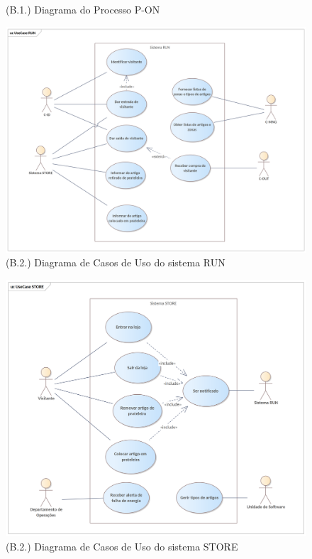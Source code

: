 \documentclass[12pt,a4paper]{article}
\begin{document}
\begin{landscape}
  \begin{figure}
    \centering
    
    \caption{(B.1.) Diagrama do Processo P-ON}
    \label{fig:p-on-bpmn}
  \end{figure}
\end{landscape}

\begin{landscape}
  \begin{figure}
    \centering
    \includegraphics[width=1.3\textwidth]{assets/ea-usecase-run.png}
    \caption{(B.2.) Diagrama de Casos de Uso do sistema RUN}
    \label{fig:uc-run}
  \end{figure}
\end{landscape}

\begin{landscape}
  \begin{figure}
    \centering
    \includegraphics[width=1.15\textwidth]{assets/ea-usecase-store.png}
    \caption{(B.2.) Diagrama de Casos de Uso do sistema STORE}
    \label{fig:uc-store}
  \end{figure}
\end{landscape}
\end{document}
